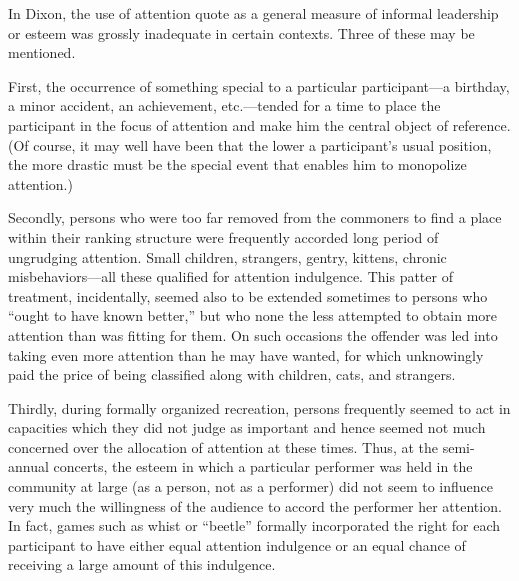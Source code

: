 \documentclass[openany,nobib]{tufte-book}
\begin{document}
In Dixon, the use of attention quote as a general measure of informal
leadership or esteem was grossly inadequate in certain contexts. Three
of these may be mentioned.

First, the occurrence of something special to a particular
participant---a birthday, a minor accident, an achievement,
etc.---tended for a time to place the participant in the focus of
attention and make him the central object of reference. (Of course, it
may well have been that the lower a participant's usual position, the
more drastic must be the special event that enables him to monopolize
attention.)

Secondly, persons who were too far removed from the commoners to find a
place within their ranking structure were frequently accorded long
period of ungrudging attention. Small children, strangers, gentry,
kittens, chronic misbehaviors---all these qualified for attention
indulgence. This patter of treatment, incidentally, seemed also to be
extended sometimes to persons who ``ought to have known better,'' but
who none the less attempted to obtain more attention than was fitting
for them. On such occasions the offender was led into taking even more
attention than he may have wanted, for which unknowingly paid the price
of being classified along with children, cats, and strangers.

Thirdly, during formally organized recreation, persons frequently seemed
to act in capacities which they did not judge as important and hence
seemed not much concerned over the allocation of attention at these
times. Thus, at the semi-annual concerts, the esteem in which a
particular performer was held in the community at large (as a person,
not as a performer) did not seem to influence very much the willingness
of the audience to accord the performer her attention. In fact, games
such as whist or ``beetle'' formally incorporated the right for each
participant to have either equal attention indulgence or an equal chance
of receiving a large amount of this indulgence.
\end{document}
